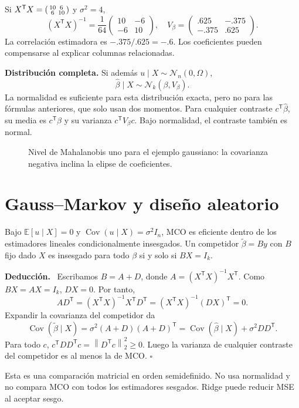 \documentclass[11pt,a4paper]{article}
\newcommand{\E}{\mathbb E}
\newcommand{\T}{^{\mathsf T}}
\newcommand{\norm}[1]{\left\lVert #1\right\rVert}
\DeclareMathOperator{\Cov}{Cov}
\newcommand{\Normal}{\mathcal N}
\newcommand{\topic}[2]{\clearpage\section{#1}\label{#2}}
\newenvironment{deduccion}{\par\textbf{Deducción.}\ }{\hfill$\square$\par}
\theoremstyle{definition}\newtheorem{definicion}[teorema]{Definición}
\begin{document}
\begin{ejemplo}
Si
$X\T X=\begin{psmallmatrix}10&6\\6&10\end{psmallmatrix}$ y $\sigma^2=4$,
\[
(X\T X)^{-1}=\frac1{64}\begin{pmatrix}10&-6\\-6&10\end{pmatrix},
\quad
V_\beta=\begin{pmatrix}.625&-.375\\-.375&.625\end{pmatrix}.
\]
La correlación estimadora es $-.375/.625=-.6$.
Los coeficientes pueden compensarse al explicar columnas relacionadas.
\end{ejemplo}
\textbf{Distribución completa.}
Si además $u\mid X\sim\Normal_n(0,\Omega)$,
\[
\widehat\beta\mid X\sim\Normal_k(\beta,V_\beta).
\]
La normalidad es suficiente para esta distribución exacta, pero no para
las fórmulas anteriores, que solo usan dos momentos.
Para cualquier contraste $c\T\widehat\beta$,
su media es $c\T\beta$ y su varianza $c\T V_\beta c$.
Bajo normalidad, el contraste también es normal.


\begin{figure}[H]\centering
{}
\caption{Nivel de Mahalanobis uno para el ejemplo gaussiano: la covarianza negativa inclina la elipse de coeficientes.}
\end{figure}
\topic{Gauss--Markov y diseño aleatorio}{s35}
Bajo $\E[u\mid X]=0$ y $\Cov(u\mid X)=\sigma^2I_n$, MCO es
eficiente dentro de los estimadores lineales condicionalmente insesgados.
Un competidor $\widetilde\beta=By$ con $B$ fijo dado $X$ es insesgado
para todo $\beta$ si y solo si $BX=I_k$.

\begin{deduccion}
Escribamos $B=A+D$, donde $A=(X\T X)^{-1}X\T$.
Como $BX=AX=I_k$, $DX=0$.
Por tanto,
\[
AD\T=(X\T X)^{-1}X\T D\T
=(X\T X)^{-1}(DX)\T=0.
\]
Expandir la covarianza del competidor da
\[
\Cov(\widetilde\beta\mid X)
=\sigma^2(A+D)(A+D)\T
=\Cov(\widehat\beta\mid X)+\sigma^2DD\T.
\]
Para todo $c$, $c\T DD\T c=\norm{D\T c}_2^2\ge0$.
Luego la varianza de cualquier contraste del competidor es al menos
la de MCO.
\end{deduccion}
Esta es una comparación matricial en orden semidefinido.
No usa normalidad y no compara MCO con todos los estimadores sesgados.
Ridge puede reducir MSE al aceptar sesgo.
\end{document}
